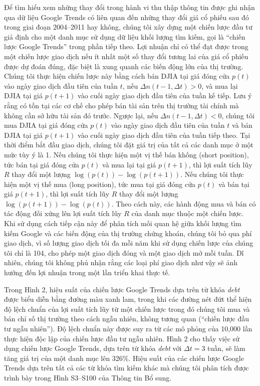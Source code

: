 Để tìm hiểu xem những thay đổi trong hành vi thu thập thông tin được ghi nhận qua dữ liệu Google Trends có liên quan đến những thay đổi giá cổ phiếu sau đó trong giai đoạn 2004--2011 hay không, chúng tôi xây dựng một chiến lược đầu tư giả định cho một danh mục sử dụng dữ liệu khối lượng tìm kiếm, gọi là ``chiến lược Google Trends'' trong phần tiếp theo. Lợi nhuận chỉ có thể đạt được trong một chiến lược giao dịch nếu ít nhất một số thay đổi tương lai của giá cổ phiếu được dự đoán đúng, đặc biệt là xung quanh các biến động lớn của thị trường. Chúng tôi thực hiện chiến lược này bằng cách bán DJIA tại giá đóng cửa $p(t)$ vào ngày giao dịch đầu tiên của tuần $t$, nếu $\Delta n(t-1, \Delta t) > 0$, và mua lại DJIA tại giá $p(t+1)$ vào cuối ngày giao dịch đầu tiên của tuần kế tiếp. Lưu ý rằng có tồn tại các cơ chế cho phép bán tài sản trên thị trường tài chính mà không cần sở hữu tài sản đó trước. Ngược lại, nếu $\Delta n(t-1, \Delta t) < 0$, chúng tôi mua DJIA tại giá đóng cửa $p(t)$ vào ngày giao dịch đầu tiên của tuần $t$ và bán DJIA tại giá $p(t+1)$ vào cuối ngày giao dịch đầu tiên của tuần tiếp theo. Tại thời điểm bắt đầu giao dịch, chúng tôi đặt giá trị của tất cả các danh mục ở một mức tùy ý là 1. Nếu chúng tôi thực hiện một vị thế bán khống (short position), tức bán tại giá đóng cửa $p(t)$ và mua lại tại giá $p(t+1)$, thì lợi suất tích lũy $R$ thay đổi một lượng $\log(p(t)) - \log(p(t+1))$. Nếu chúng tôi thực hiện một vị thế mua (long position), tức mua tại giá đóng cửa $p(t)$ và bán tại giá $p(t+1)$, thì lợi suất tích lũy $R$ thay đổi một lượng $\log(p(t+1)) - \log(p(t))$. Theo cách này, các hành động mua và bán có tác động đối xứng lên lợi suất tích lũy $R$ của danh mục thuộc một chiến lược. Khi sử dụng cách tiếp cận này để phân tích mối quan hệ giữa khối lượng tìm kiếm Google và các biến động của thị trường chứng khoán, chúng tôi bỏ qua phí giao dịch, vì số lượng giao dịch tối đa mỗi năm khi sử dụng chiến lược của chúng tôi chỉ là 104, cho phép một giao dịch đóng và một giao dịch mở mỗi tuần. Dĩ nhiên, chúng tôi không phủ nhận rằng các loại phí giao dịch như vậy sẽ ảnh hưởng đến lợi nhuận trong một lần triển khai thực tế.

Trong Hình 2, hiệu suất của chiến lược Google Trends dựa trên từ khóa \emph{debt} được biểu diễn bằng đường màu xanh lam, trong khi các đường nét đứt thể hiện độ lệch chuẩn của lợi suất tích lũy từ một chiến lược trong đó chúng tôi mua và bán chỉ số thị trường theo cách ngẫu nhiên, không tương quan (``chiến lược đầu tư ngẫu nhiên''). Độ lệch chuẩn này được suy ra từ các mô phỏng của 10,000 lần thực hiện độc lập của chiến lược đầu tư ngẫu nhiên. Hình 2 cho thấy việc sử dụng chiến lược Google Trends, dựa trên từ khóa \emph{debt} với $\Delta t = 3$ tuần, sẽ làm tăng giá trị của một danh mục lên 326\%. Hiệu suất của các chiến lược Google Trends dựa trên tất cả các từ khóa tìm kiếm khác mà chúng tôi phân tích được trình bày trong Hình S3--S100 của Thông tin Bổ sung.

